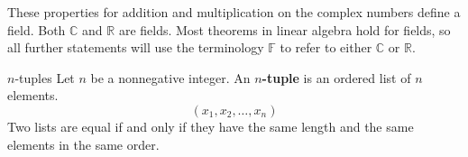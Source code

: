 \documentclass{article}
\newcommand{\real}{\mathbb{R}}
\newcommand{\complex}{\mathbb{C}}
\newcommand{\field}{\mathbb{F}}
\begin{document}
\noindent These properties for addition and multiplication on the complex 
numbers define a field. Both $ \complex $ and $ \real $ are fields. Most 
theorems in linear algebra hold for fields, so all further statements will use 
the terminology $ \field $ to refer to either $ \complex $ or $ \real $.

\begin{defn}{$n$-tuples}
    Let $ n $ be a nonnegative integer. An \textbf{$n$-tuple} is an ordered list
    of $ n $ elements.
    \[
        (x_1,x_2,\dots,x_n)
    \]
    Two lists are equal if and only if they have the same length and the same
    elements in the same order.
\end{defn}
\end{document}
